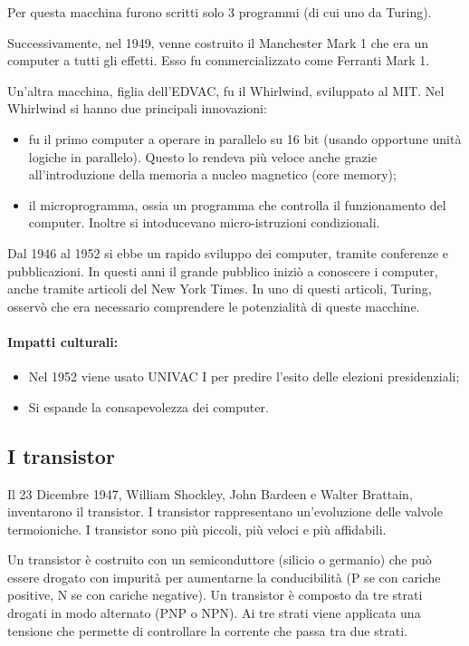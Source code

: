 Per questa macchina furono scritti solo 3 programmi (di cui uno da Turing).

Successivamente, nel 1949, venne costruito il Manchester Mark 1 che era un computer a tutti gli effetti.
Esso fu commercializzato come Ferranti Mark 1.

Un'altra macchina, figlia dell'EDVAC, fu il Whirlwind, sviluppato al MIT.
Nel Whirlwind si hanno due principali innovazioni:

\begin{itemize}
    \item fu il primo computer a operare in parallelo su 16 bit (usando opportune 
    unità logiche in parallelo). Questo lo rendeva più veloce anche grazie all'introduzione
    della memoria a nucleo magnetico (core memory);
    \item il microprogramma, ossia un programma che controlla il funzionamento del computer. 
    Inoltre si intoducevano micro-istruzioni condizionali.
\end{itemize}

Dal 1946 al 1952 si ebbe un rapido sviluppo dei computer, tramite conferenze e pubblicazioni.
In questi anni il grande pubblico iniziò a conoscere i computer, anche tramite articoli
del New York Times. In uno di questi articoli, Turing, osservò che era necessario comprendere
le potenzialità di queste macchine.

\paragraph{Impatti culturali:}

\begin{itemize}
    \item Nel 1952 viene usato UNIVAC I per predire l'esito delle elezioni presidenziali;
    \item Si espande la consapevolezza dei computer.
\end{itemize}

\subsection{I transistor}

Il 23 Dicembre 1947, William Shockley, John Bardeen e Walter Brattain, 
inventarono il transistor. I transistor rappresentano un'evoluzione
delle valvole termoioniche. I transistor sono più piccoli, più veloci e
più affidabili.

Un transistor è costruito con un semiconduttore (silicio o germanio) che
può essere drogato con impurità per aumentarne la conducibilità (P se con
cariche positive, N se con cariche negative). Un transistor è composto da
tre strati drogati in modo alternato (PNP o NPN). Ai tre strati viene applicata 
una tensione che permette di controllare la corrente che passa tra due strati.


